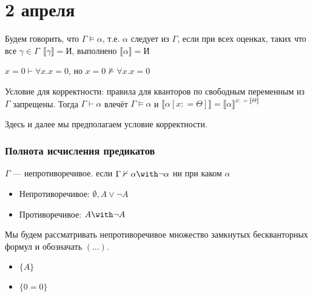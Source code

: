 \chapter{2 апреля}

\begin{definition}
    Будем говорить, что \(\Gamma \vDash \alpha\), т.е. \(\alpha\) следует из \(\Gamma\), если при всех оценках, таких что все \(\gamma \in \Gamma \ \ \llbracket \gamma \rrbracket = \text{И}\), выполнено \(\llbracket \alpha \rrbracket = \text{И}\)
\end{definition}

\begin{example}
    \(x = 0 \vdash \forall x.x = 0\), но \(x = 0 \nvDash \forall x.x = 0\)
\end{example}

Условие для корректности: правила для кванторов по свободным переменным из \(\Gamma\) запрещены. Тогда \(\Gamma \vdash \alpha\) влечёт \(\Gamma \vDash \alpha\) и \(\llbracket \alpha [x: = \Theta] \rrbracket = \llbracket \alpha \rrbracket^{x: = \llbracket \Theta \rrbracket}\)

\begin{remark}
    Здесь и далее мы предполагаем условие корректности.
\end{remark}

\subsection{Полнота исчисления предикатов}

\begin{definition}
    \(\Gamma\) --- непротиворечивое. если \(\Gamma \nvdash \alpha \with \neg \alpha\) ни при каком \(\alpha\)
\end{definition}

\begin{example}\itemfix
    \begin{itemize}
        \item Непротиворечивое: \(\emptyset, A \lor \neg A\)
        \item Противоречивое: \(A \with \neg A\)
    \end{itemize}
\end{example}

Мы будем рассматривать непротиворечивое множество замкнутых бескванторных формул и обозначать \((\ldots)\).
\begin{example}\itemfix
    \begin{itemize}
        \item \(\{A\}\)
        \item \(\{0 = 0\}\)
    \end{itemize}
\end{example}

